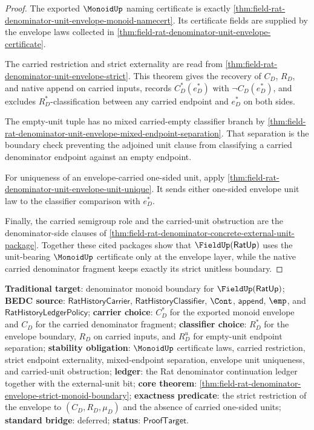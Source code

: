 \begin{proof}
The exported $\MonoidUp$ naming certificate is exactly
\autoref{thm:field-rat-denominator-unit-envelope-monoid-namecert}. Its
certificate fields are supplied by the envelope laws collected in
\autoref{thm:field-rat-denominator-unit-envelope-certificate}.

The carried restriction and strict externality are read from
\autoref{thm:field-rat-denominator-unit-envelope-strict}. This theorem gives
the recovery of $C_D$, $R_D$, and native append on carried inputs, records
$C_D^\ast(e_D^\ast)$ with $\neg C_D(e_D^\ast)$, and excludes
$R_D^\ast$-classification between any carried endpoint and $e_D^\ast$ on both
sides.

The empty-unit tuple has no mixed carried-empty classifier branch by
\autoref{thm:field-rat-denominator-unit-envelope-mixed-endpoint-separation}.
That separation is the boundary check preventing the adjoined unit clause from
classifying a carried denominator endpoint against an empty endpoint.

For uniqueness of an envelope-carried one-sided unit, apply
\autoref{thm:field-rat-denominator-unit-envelope-unit-unique}. It sends either
one-sided envelope unit law to the classifier comparison with $e_D^\ast$.

Finally, the carried semigroup role and the carried-unit obstruction are the
denominator-side clauses of
\autoref{thm:field-rat-denominator-concrete-external-unit-package}. Together
these cited packages show that $\FieldUp(\mathsf{RatUp})$ uses the
unit-bearing $\MonoidUp$ certificate only at the envelope layer, while the
native carried denominator fragment keeps exactly its strict unitless
boundary.
\end{proof}

\textbf{Traditional target}: denominator monoid boundary for
$\FieldUp(\mathsf{RatUp})$; \textbf{BEDC source}:
$\mathsf{RatHistoryCarrier}$, $\mathsf{RatHistoryClassifier}$, $\Cont$,
$\mathsf{append}$, $\emp$, and $\mathsf{RatHistoryLedgerPolicy}$;
\textbf{carrier choice}: $C_D^\ast$ for the exported monoid envelope and
$C_D$ for the carried denominator fragment; \textbf{classifier choice}:
$R_D^\ast$ for the envelope boundary, $R_D$ on carried inputs, and $R_D^u$ for
empty-unit endpoint separation; \textbf{stability obligation}: $\MonoidUp$
certificate laws, carried restriction, strict endpoint externality,
mixed-endpoint separation, envelope unit uniqueness, and carried-unit
obstruction; \textbf{ledger}: the Rat denominator continuation ledger together
with the external-unit bit; \textbf{core theorem}:
\autoref{thm:field-rat-denominator-envelope-strict-monoid-boundary};
\textbf{exactness predicate}: the strict restriction of the envelope to
$(C_D,R_D,\mu_D)$ and the absence of carried one-sided units;
\textbf{standard bridge}: deferred; \textbf{status}: $\mathsf{ProofTarget}$.
